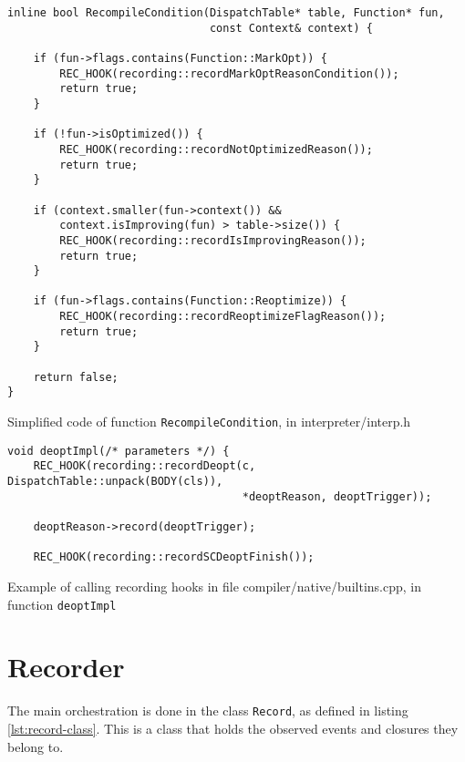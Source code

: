 \begin{listing}
	\begin{verbatim}
inline bool RecompileCondition(DispatchTable* table, Function* fun,
                               const Context& context) {

    if (fun->flags.contains(Function::MarkOpt)) {
        REC_HOOK(recording::recordMarkOptReasonCondition());
        return true;
    }

    if (!fun->isOptimized()) {
        REC_HOOK(recording::recordNotOptimizedReason());
        return true;
    }

    if (context.smaller(fun->context()) &&
        context.isImproving(fun) > table->size()) {
        REC_HOOK(recording::recordIsImprovingReason());
        return true;
    }

    if (fun->flags.contains(Function::Reoptimize)) {
        REC_HOOK(recording::recordReoptimizeFlagReason());
        return true;
    }

    return false;
}
\end{verbatim}
	\caption{Simplified code of function \texttt{RecompileCondition}, in interpreter/interp.h}\label{lst:hook-recompile-condition}
\end{listing}



\begin{listing}
	\begin{verbatim}
void deoptImpl(/* parameters */) {
    REC_HOOK(recording::recordDeopt(c, DispatchTable::unpack(BODY(cls)),
                                    *deoptReason, deoptTrigger));

    deoptReason->record(deoptTrigger);

    REC_HOOK(recording::recordSCDeoptFinish());
  \end{verbatim}
	\caption{Example of calling recording hooks in file compiler/native/builtins.cpp, in function \texttt{deoptImpl}}\label{lst:hook-deopt}
\end{listing}


\section{Recorder}

The main orchestration is done in the class \texttt{Record}, as defined in listing \ref{lst:record-class}. This is a class that holds the observed events and closures they belong to.


